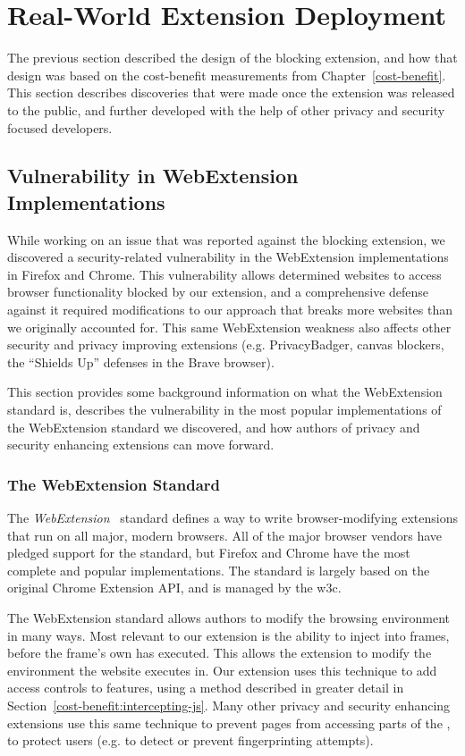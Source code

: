 \section{Real-World Extension Deployment}
\label{current-web:extension-deployment}
The previous section described the design of the \WAPI blocking extension, and
how that design was based on the cost-benefit measurements from
Chapter~\ref{cost-benefit}.  This section describes discoveries that were
made once the extension was released to the public, and further
developed with the help of other privacy and security focused developers.


\subsection{Vulnerability in WebExtension Implementations}
While working on an issue that was reported against the blocking extension, we
discovered a security-related vulnerability in the WebExtension implementations
in Firefox and Chrome.  This vulnerability allows determined websites to access
browser functionality blocked by our extension, and a comprehensive defense
against it required modifications to our approach that breaks more websites
than we originally accounted for.  This same WebExtension weakness also affects
other security and privacy improving extensions (e.g. PrivacyBadger, canvas
blockers, the ``Shields Up'' defenses in the Brave browser).

This section provides some background information on what the WebExtension
standard is, describes the vulnerability in the most popular
implementations of the WebExtension standard we discovered,
and how authors of privacy and security enhancing extensions can move forward.


\subsubsection{The WebExtension Standard}
The \textit{WebExtension}~\cite{webext2018standard} standard defines a way
to write browser-modifying extensions that run on all major, modern browsers.
All of the major browser vendors have pledged support for the standard, but
Firefox and Chrome have the most complete and popular implementations.
The standard is largely based on the original Chrome Extension API, and is
managed by the \gls{w3c}.

The WebExtension standard allows authors to modify the browsing environment
in many ways.  Most relevant to our extension is the ability to inject
\JS into frames, before the frame's own \JS has executed.  This allows the
extension to modify the environment the website executes in.  Our extension
uses this technique to add access controls to \WAPI features, using a method
described in greater detail in Section~\ref{cost-benefit:intercepting-js}.
Many other privacy and security enhancing extensions use
this same technique to prevent pages from accessing parts of the \WAPI, to
protect users (e.g. to detect or prevent fingerprinting attempts).


